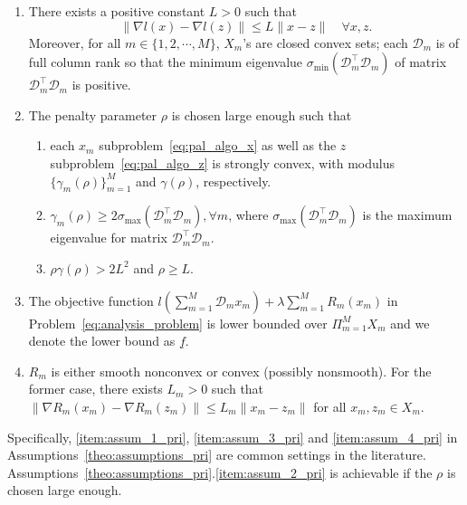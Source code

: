 \begin{assume}\label{theo:assumptions_pri}
\begin{enumerate}
    \item There exists a positive constant $L>0$ such that
        \[
            \|\nabla l(x)-\nabla l(z)\| \le L\|x-z\|\quad \forall x, z.
        \]
        Moreover, for all $m\in\{1,2,\cdots,M\}$, $X_m$'s are closed convex sets; each $\mathcal{D}_m$ is of full column rank so that the minimum eigenvalue $\sigma_{\text{min}}(\mathcal{D}_m^\top \mathcal{D}_m)$ of matrix $\mathcal{D}_m^\top \mathcal{D}_m$ is positive.\label{item:assum_1_pri}
    \item The penalty parameter $\rho$ is chosen large enough such that
    \begin{enumerate}
        \item each $x_m$ subproblem~\eqref{eq:pal_algo_x} as well as the $z$ subproblem~\eqref{eq:pal_algo_z} is strongly convex, with modulus $\{\gamma_m(\rho)\}_{m=1}^M$ and $\gamma(\rho)$, respectively. \label{item:asusum_2_1_pri}
        \item $\gamma_m(\rho)\ge 2\sigma_{\text{max}}(\mathcal{D}_m^\top \mathcal{D}_m), \forall m$, where $\sigma_{\text{max}}(\mathcal{D}_m^\top \mathcal{D}_m)$ is the maximum eigenvalue for matrix $\mathcal{D}_m^\top \mathcal{D}_m$.
        \item$\rho\gamma(\rho)>2L^2$ and $\rho\ge L$.
    \end{enumerate}
    \label{item:assum_2_pri}
    \item The objective function $l\left(\sum_{m=1}^{M} \mathcal{D}_mx_m\right) + \lambda\sum_{m=1}^{M} R_m(x_m)$ in Problem~\ref{eq:analysis_problem} is lower bounded over $\Pi_{m=1}^MX_m$ and we denote the lower bound as $\underline{f}$.\label{item:assum_3_pri}
    \item $R_m$ is either smooth nonconvex or convex (possibly nonsmooth). For the former case, there exists $L_m>0$ such that $\|\nabla R_m(x_m) - \nabla R_m(z_m)\|\le L_m\|x_m-z_m\|$ for all $x_m, z_m\in X_m$.\label{item:assum_4_pri}
\end{enumerate}
\end{assume}

Specifically, \ref{item:assum_1_pri}, \ref{item:assum_3_pri} and \ref{item:assum_4_pri} in Assumptions~\ref{theo:assumptions_pri} are common settings in the literature. Assumptions~\ref{theo:assumptions_pri}.\ref{item:assum_2_pri} is achievable if the $\rho$ is chosen large enough.


